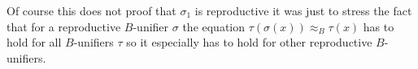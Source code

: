 		Of course this does not proof that $\sigma_1$ is reproductive it was just to stress the fact that for a reproductive $B$-unifier $\sigma$ the equation $\tau(\sigma(x))\approx_B\tau(x)$ has to hold for all $B$-unifiers $\tau$ so it especially has to hold for other reproductive $B$-unifiers.
